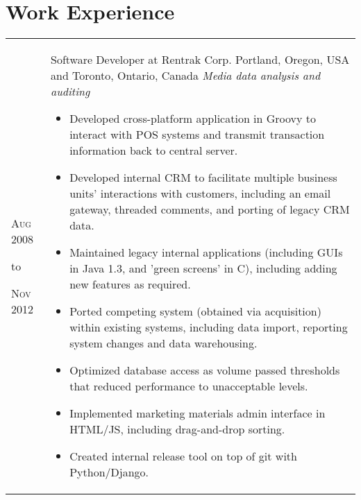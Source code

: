 \documentclass[a4paper,10pt]{article}
\begin{document}
        \section{Work Experience}
        \begin{tabular}{ R{1.5cm} | p{10.5cm} }
            \hfill \textsc{Aug 2008}\newline
            \begin{center} to \end{center}
            \hfill \textsc{Nov 2012} &
                            Software Developer at Rentrak Corp.\newline
                            Portland, Oregon, USA and Toronto, Ontario, Canada\newline
                            \emph{Media data analysis and auditing} \newline
                            \fontsize{9pt}{10pt}\selectfont
                            \begin{itemize}
                                \item Developed cross-platform application in Groovy to interact with POS
                                    systems and transmit transaction information back to central server.
                                \item Developed internal CRM to facilitate multiple business units' interactions
                                    with customers, including an email gateway, threaded comments, and porting of
                                    legacy CRM data.
                                \item Maintained legacy internal applications (including GUIs in Java 1.3, and
                                    'green screens' in C), including adding new features as required.
                                \item Ported competing system (obtained via acquisition) within existing systems,
                                    including data import, reporting system changes and data warehousing.
                                \item Optimized database access as volume passed thresholds that reduced
                                    performance to unacceptable levels.
                                \item Implemented marketing materials admin interface in HTML/JS, including
                                    drag-and-drop sorting.
                                \item Created internal release tool on top of git with Python/Django.

\end{itemize}
\end{tabular}
\end{document}
